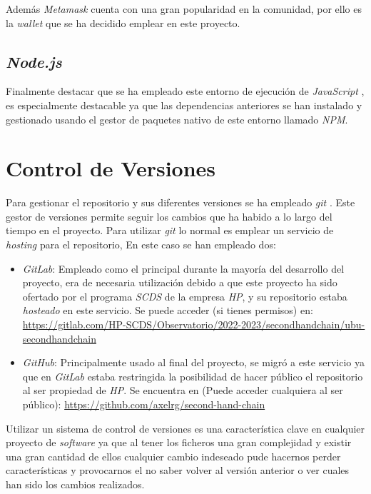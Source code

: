 Además \textit{Metamask} cuenta con una gran popularidad en la comunidad, por ello es la \textit{wallet} que se ha decidido emplear en este proyecto.

\subsection{\textit{Node.js}}
Finalmente destacar que se ha empleado este entorno de ejecución de \textit{JavaScript} \cite{nodejsNodejs}, es especialmente destacable ya que las dependencias anteriores se han instalado y gestionado usando el gestor de paquetes nativo de este entorno llamado \textit{NPM}.

\section{Control de Versiones}

Para gestionar el repositorio y sus diferentes versiones se ha empleado \textit{git} \cite{gitscm}. Este gestor de versiones permite seguir los cambios que ha habido a lo largo del tiempo en el proyecto. Para utilizar \textit{git} lo normal es emplear un servicio de \textit{hosting} para el repositorio, En este caso se han empleado dos:
\begin{itemize}
    \item \textit{GitLab}: Empleado como el principal durante la mayoría del desarrollo del proyecto, era de necesaria utilización debido a que este proyecto ha sido ofertado por el programa \textit{SCDS} de la empresa \textit{HP}, y su repositorio estaba \textit{hosteado} en este servicio. Se puede acceder (si tienes permisos) en: \url{https://gitlab.com/HP-SCDS/Observatorio/2022-2023/secondhandchain/ubu-secondhandchain}
    \item \textit{GitHub}: Principalmente usado al final del proyecto, se migró a este servicio ya que en \textit{GitLab} estaba restringida la posibilidad de hacer público el repositorio al ser propiedad de \textit{HP}. Se encuentra en (Puede acceder cualquiera al ser público): \url{https://github.com/axelrg/second-hand-chain}
\end{itemize}

Utilizar un sistema de control de versiones es una característica clave en cualquier proyecto de \textit{software} ya que al tener los ficheros una gran complejidad y existir una gran cantidad de ellos cualquier cambio indeseado pude hacernos perder características y provocarnos el no saber volver  al versión anterior o ver cuales han sido los cambios realizados.

